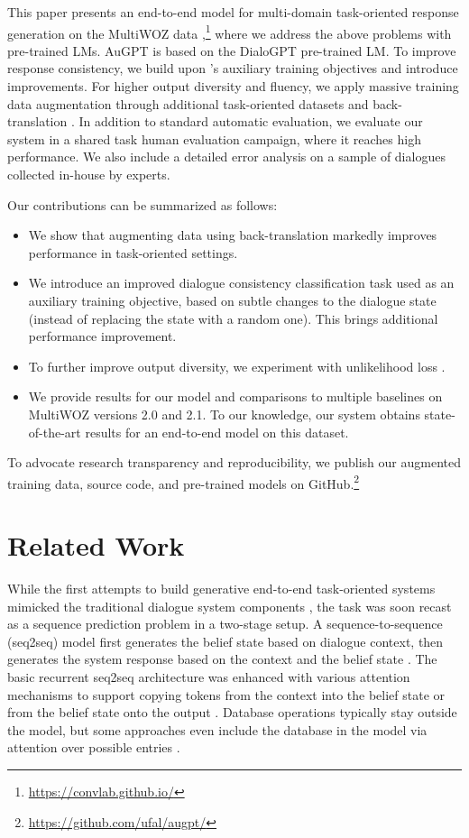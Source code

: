 \documentclass[11pt,a4paper]{article}
\newcommand{\Augpt}[0]{AuGPT\xspace}
\begin{document}
This paper presents an end-to-end model for multi-domain task-oriented response generation on the MultiWOZ data \cite{budzianowski2018},\footnote{\url{https://convlab.github.io/}} where we address the above problems with pre-trained LMs. \Augpt is based on the DialoGPT pre-trained LM. To improve response consistency, we build upon \citet{peng2020}'s auxiliary training objectives and introduce improvements. For higher output diversity and fluency, we apply massive training data augmentation through additional task-oriented datasets and back-translation \cite{sennrich2016}. In addition to standard automatic evaluation, we evaluate our system in a shared task human evaluation campaign, where it reaches high performance. We also include a detailed error analysis on a sample of dialogues collected in-house by experts.

Our contributions can be summarized as follows:
\begin{itemize}
    \item We show that augmenting data using back-translation markedly improves performance in task-oriented settings.
    \item We introduce an improved dialogue consistency classification task used as an auxiliary training objective, based on subtle changes to the dialogue state (instead of replacing the state with a random one). This brings additional performance improvement.
    \item To further improve output diversity, we experiment with unlikelihood loss \cite{welleck2019,li_dont_2020}.
    \item We provide results for our model and comparisons to multiple baselines on MultiWOZ versions 2.0 and 2.1. To our knowledge, our system obtains state-of-the-art results for an end-to-end model on this dataset.
\end{itemize}

To advocate research transparency and reproducibility, we publish our augmented training data, source code, and pre-trained models on GitHub.\footnote{\url{https://github.com/ufal/augpt/}}

\section{Related Work}

While the first attempts to build generative end-to-end task-oriented systems mimicked the traditional dialogue system components \citep{wen2017}, the task was soon recast as a sequence prediction problem in a two-stage setup. A sequence-to-sequence (seq2seq) model first generates the belief state based on dialogue context, then generates the system response based on the context and the belief state \cite[Sequicity;][]{lei2018}.
The basic recurrent seq2seq architecture \cite{sutskever2014} was enhanced with various attention mechanisms to support copying tokens from the context into the belief state or from the belief state onto the output \cite{wu2018, shu2019}. Database operations typically stay outside the model, but some approaches even include the database in the model via attention over possible entries \cite{manning2017,wen2018,madotto2018}. 
\end{document}
